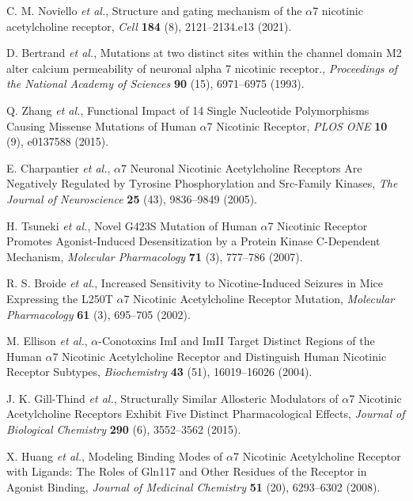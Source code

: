 C. M. Noviello {\em et al.}, Structure and gating mechanism of the $\alpha$7 nicotinic acetylcholine receptor, {\em Cell} {\bf 184} (8), 2121--2134.e13 (2021).

D. Bertrand {\em et al.}, Mutations at two distinct sites within the channel domain M2 alter calcium permeability of neuronal alpha 7 nicotinic receptor., {\em Proceedings of the National Academy of Sciences} {\bf 90} (15), 6971--6975 (1993).

Q. Zhang {\em et al.}, Functional Impact of 14 Single Nucleotide Polymorphisms Causing Missense Mutations of Human $\alpha$7 Nicotinic Receptor, {\em PLOS ONE} {\bf 10} (9), e0137588 (2015).

E. Charpantier {\em et al.}, $\alpha$7 Neuronal Nicotinic Acetylcholine Receptors Are Negatively Regulated by Tyrosine Phosphorylation and Src-Family Kinases, {\em The Journal of Neuroscience} {\bf 25} (43), 9836--9849 (2005).

H. Tsuneki {\em et al.}, Novel G423S Mutation of Human $\alpha$7 Nicotinic Receptor Promotes Agonist-Induced Desensitization by a Protein Kinase C-Dependent Mechanism, {\em Molecular Pharmacology} {\bf 71} (3), 777--786 (2007).

R. S. Broide {\em et al.}, Increased Sensitivity to Nicotine-Induced Seizures in Mice Expressing the L250T $\alpha$7 Nicotinic Acetylcholine Receptor Mutation, {\em Molecular Pharmacology} {\bf 61} (3), 695--705 (2002).

M. Ellison {\em et al.}, $\alpha$-Conotoxins ImI and ImII Target Distinct Regions of the Human $\alpha$7 Nicotinic Acetylcholine Receptor and Distinguish Human Nicotinic Receptor Subtypes, {\em Biochemistry} {\bf 43} (51), 16019--16026 (2004).

J. K. Gill-Thind {\em et al.}, Structurally Similar Allosteric Modulators of $\alpha$7 Nicotinic Acetylcholine Receptors Exhibit Five Distinct Pharmacological Effects, {\em Journal of Biological Chemistry} {\bf 290} (6), 3552--3562 (2015).

X. Huang {\em et al.}, Modeling Binding Modes of $\alpha$7 Nicotinic Acetylcholine Receptor with Ligands: The Roles of Gln117 and Other Residues of the Receptor in Agonist Binding, {\em Journal of Medicinal Chemistry} {\bf 51} (20), 6293--6302 (2008).

